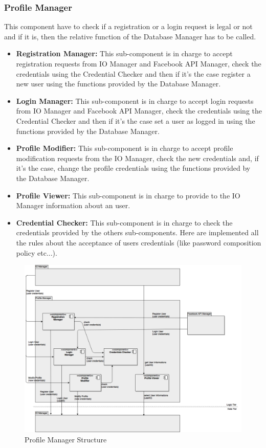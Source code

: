 \documentclass[../../../../../../../dd.tex]{subfiles}
\begin{document}
	\subsubsection{Profile Manager}
		This component have to check if a registration or a login request is legal or not and if it is, then the relative function of the Database Manager has to be called.
		\begin{itemize}
			\item \textbf{Registration Manager:} This sub-component is in charge to accept registration requests from IO Manager and Facebook API Manager, check the credentials using the Credential Checker and then if it's the case register a new user using the functions provided by the Database Manager.

			\item \textbf{Login Manager:} This sub-component is in charge to accept login requests from IO Manager and Facebook API Manager, check the credentials using the Credential Checker and then if it's the case set a user as logged in using the functions provided by the Database Manager.

			\item \textbf{Profile Modifier:} This sub-component is in charge to accept profile modification requests from the IO Manager, check the new credentials and, if it's the case, change the profile credentials using the functions provided by the Database Manager.

			\item \textbf{Profile Viewer:} This sub-component is in charge to provide to the IO Manager information about an user.

			\item \textbf{Credential Checker:} This sub-component is in charge to check the credentials provided by the others sub-components. Here are implemented all the rules about the acceptance of users credentials (like password composition policy etc...).
		\end{itemize}

		\begin{figure}[H]
				\centering
				\includegraphics[width=\textwidth, scale=0.5]{../images/ProfileManager.png}
			\caption{Profile Manager Structure}\label{fig:ProfileManager}
		\end{figure}
		
\end{document}
